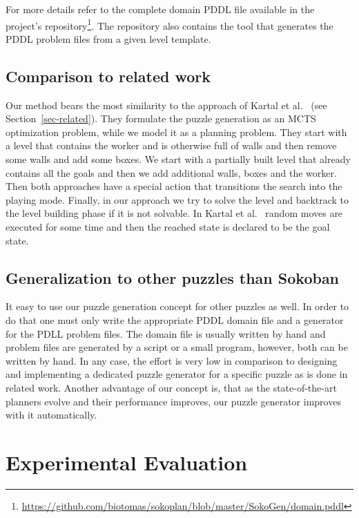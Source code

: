 \documentclass[runningheads]{llncs}
\begin{document}
For more details refer to the complete domain PDDL file available in the project's
repository\footnote{\url{https://github.com/biotomas/sokoplan/blob/master/SokoGen/domain.pddl}}.
The repository also contains the tool that generates the PDDL problem files from a given level template.


\subsection{Comparison to related work}
Our method bears the most similarity to the approach of Kartal et al.~\cite{kartal2016data} (see Section~\ref{sec-related}).
They formulate the puzzle generation as an MCTS optimization problem, while we model it as a planning
problem. They start with a level that contains the worker and is otherwise full of walls and then remove some
walls and add some boxes. We start with
a partially built level that already contains all the goals and then we add additional walls, boxes and the worker.
Then both approaches have a special action that transitions the search into the playing mode.
Finally, in our approach we try to solve the level and backtrack to the level building phase if it is not solvable.
In Kartal et al.~\cite{kartal2016data} random moves are executed for some time and then the reached state is
declared to be the goal state.

\subsection{Generalization to other puzzles than Sokoban}
It easy to use our puzzle generation concept for other puzzles as well. In order to
do that one must only write the appropriate PDDL domain file and a generator for the PDLL problem files. 
The domain file is usually written by hand and problem files are generated by a script or a small program,
however, both can be written by hand. In any case, the effort is very low in comparison to designing and
implementing a dedicated puzzle generator for a specific puzzle as is done in related work.
Another advantage of our concept is, that as the state-of-the-art planners evolve and their performance
improves, our puzzle generator improves with it automatically.

\section{Experimental Evaluation}
\end{document}
